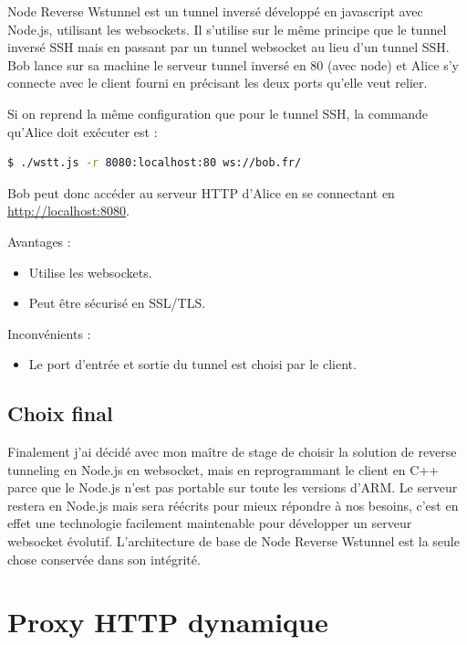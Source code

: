 Node Reverse Wstunnel est un tunnel inversé développé en javascript
avec Node.js, utilisant les websockets. Il s'utilise sur le même
principe que le tunnel inversé SSH mais en passant par un tunnel
websocket au lieu d'un tunnel SSH. Bob lance sur sa machine le serveur
tunnel inversé en 80 (avec node) et Alice s'y connecte avec le client
fourni en précisant les deux ports qu'elle veut relier.

Si on reprend la même configuration que pour le tunnel SSH, la
commande qu'Alice doit exécuter est :
\begin{lstlisting}[language=bash]
  $ ./wstt.js -r 8080:localhost:80 ws://bob.fr/
\end{lstlisting}%

Bob peut donc accéder au serveur HTTP d'Alice en se connectant en
\url{http://localhost:8080}.

Avantages :
\begin{itemize}
    \item Utilise les websockets.
    \item Peut être sécurisé en SSL/TLS.
\end{itemize}

Inconvénients :
\begin{itemize}
    \item Le port d'entrée et sortie du tunnel est choisi par le client.
\end{itemize}

\subsection{Choix final}

Finalement j'ai décidé avec mon maître de stage de choisir la solution
de reverse tunneling en Node.js en websocket, mais en reprogrammant le
client en C++ parce que le Node.js n'est pas portable sur toute les
versions d'ARM. Le serveur restera en Node.js mais sera réécrits pour
mieux répondre à nos besoins, c'est en effet une technologie
facilement maintenable pour développer un serveur websocket
évolutif. L'architecture de base de Node Reverse Wstunnel est la seule
chose conservée dans son intégrité.

\section{Proxy HTTP dynamique}

